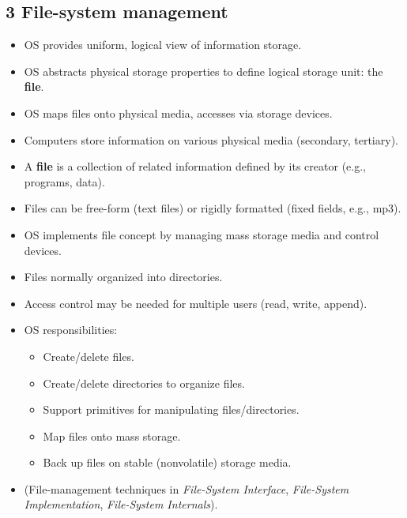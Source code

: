 \documentclass{article}
\begin{document}
\subsection*{3 File-system management}
\begin{itemize}
    \item OS provides uniform, logical view of information storage.
    \item OS abstracts physical storage properties to define logical storage unit: the \textbf{file}.
    \item OS maps files onto physical media, accesses via storage devices.
    \item Computers store information on various physical media (secondary, tertiary).
    \item A \textbf{file} is a collection of related information defined by its creator (e.g., programs, data).
    \item Files can be free-form (text files) or rigidly formatted (fixed fields, e.g., mp3).
    \item OS implements file concept by managing mass storage media and control devices.
    \item Files normally organized into directories.
    \item Access control may be needed for multiple users (read, write, append).
    \item OS responsibilities:
    \begin{itemize}
        \item Create/delete files.
        \item Create/delete directories to organize files.
        \item Support primitives for manipulating files/directories.
        \item Map files onto mass storage.
        \item Back up files on stable (nonvolatile) storage media.
    \end{itemize}
    \item (File-management techniques in \textit{File-System Interface}, \textit{File-System Implementation}, \textit{File-System Internals}).
\end{itemize}
\end{document}
